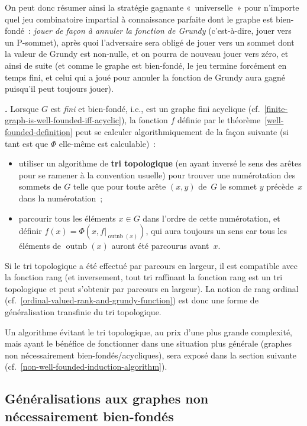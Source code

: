 \documentclass[12pt,a4paper]{article}
\theoremstyle{definition}
\newcommand\thingy{%
\refstepcounter{comcnt}\smallskip\noindent\textbf{\thecomcnt.} }
\newcommand{\outnb}{\operatorname{outnb}}
\newcommand{\defin}[2][]{\def\latexsucks{#1}\ifx\latexsucks\empty\index{#2}\else\index{\latexsucks}\fi\textbf{#2}}
\begin{document}
On peut donc résumer ainsi la stratégie gagnante « universelle » pour
n'importe quel jeu combinatoire impartial à connaissance parfaite dont
le graphe est bien-fondé : \emph{jouer de façon à annuler la fonction
  de Grundy} (c'est-à-dire, jouer vers un P-sommet), après quoi
l'adversaire sera obligé de jouer vers un sommet dont la valeur de
Grundy est non-nulle, et on pourra de nouveau jouer vers zéro, et
ainsi de suite (et comme le graphe est bien-fondé, le jeu termine
forcément en temps fini, et celui qui a joué pour annuler la fonction
de Grundy aura gagné puisqu'il peut toujours jouer).

\thingy\label{well-founded-induction-algorithm} Lorsque $G$ est
\emph{fini} et bien-fondé, i.e., est un graphe fini acyclique
(cf. \ref{finite-graph-is-well-founded-iff-acyclic}), la fonction $f$
définie par le théorème \ref{well-founded-definition} peut se calculer
algorithmiquement de la façon suivante (si tant est que $\Phi$
elle-même est calculable) :
\begin{itemize}
\item utiliser un algorithme de \defin{tri topologique} (en ayant
  inversé le sens des arêtes pour se ramener à la convention usuelle)
  pour trouver une numérotation des sommets de $G$ telle que pour
  toute arête $(x,y)$ de $G$ le sommet $y$ précède $x$ dans la
  numérotation ;
\item parcourir tous les éléments $x\in G$ dans l'ordre de cette
  numérotation, et définir $f(x) = \Phi(x, f|_{\outnb(x)})$, qui aura
  toujours un sens car tous les éléments de $\outnb(x)$ auront été
  parcourus avant $x$.
\end{itemize}
Si le tri topologique a été effectué par parcours en largeur, il est
compatible avec la fonction rang (et inversement, tout tri raffinant
la fonction rang est un tri topologique et peut s'obtenir par parcours
en largeur).  La notion de rang ordinal
(cf. \ref{ordinal-valued-rank-and-grundy-function}) est donc une forme
de généralisation transfinie du tri topologique.

Un algorithme évitant le tri topologique, au prix d'une plus grande
complexité, mais ayant le bénéfice de fonctionner dans une situation
plus générale (graphes non nécessairement bien-fondés/acycliques),
sera exposé dans la section suivante
(cf. \ref{non-well-founded-induction-algorithm}).



\subsection{Généralisations aux graphes non nécessairement bien-fondés}
\end{document}
